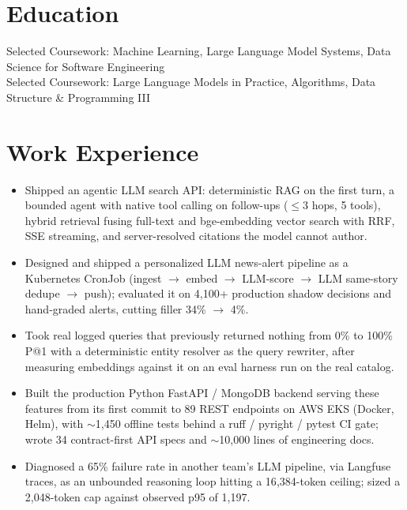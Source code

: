 \documentclass[11pt, letterpaper]{article}
\begin{document}

\section{Education}
Selected Coursework: Machine Learning, Large Language Model Systems, Data Science for Software Engineering\\[1pt]
Selected Coursework: Large Language Models in Practice, Algorithms, Data Structure \& Programming III

\section{Work Experience}
\begin{itemize}
  \item Shipped an agentic LLM search API: deterministic RAG on the first turn, a bounded agent with native tool calling on follow-ups ($\le$3 hops, 5 tools), hybrid retrieval fusing full-text and bge-embedding vector search with RRF, SSE streaming, and server-resolved citations the model cannot author.
  \item Designed and shipped a personalized LLM news-alert pipeline as a Kubernetes CronJob (ingest $\to$ embed $\to$ LLM-score $\to$ LLM same-story dedupe $\to$ push); evaluated it on 4{,}100+ production shadow decisions and hand-graded alerts, cutting filler 34\% $\to$ 4\%.
  \item Took real logged queries that previously returned nothing from 0\% to 100\% P@1 with a deterministic entity resolver as the query rewriter, after measuring embeddings against it on an eval harness run on the real catalog.
  \item Built the production Python FastAPI / MongoDB backend serving these features from its first commit to 89 REST endpoints on AWS EKS (Docker, Helm), with $\sim$1{,}450 offline tests behind a ruff / pyright / pytest CI gate; wrote 34 contract-first API specs and $\sim$10{,}000 lines of engineering docs.
  \item Diagnosed a 65\% failure rate in another team's LLM pipeline, via Langfuse traces, as an unbounded reasoning loop hitting a 16{,}384-token ceiling; sized a 2{,}048-token cap against observed p95 of 1{,}197.
\end{itemize}
\end{document}
